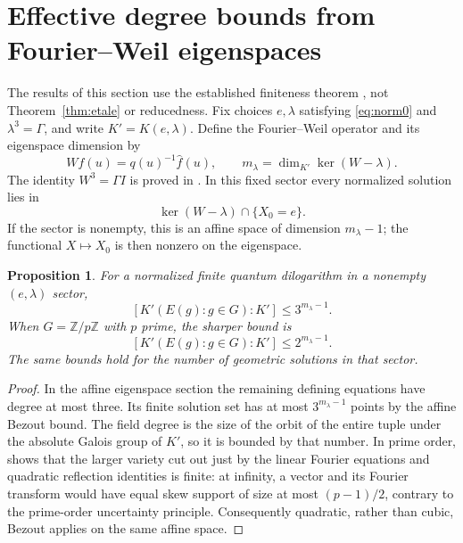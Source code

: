 \documentclass[11pt]{article}
\newtheorem{proposition}[theorem]{Proposition}
\theoremstyle{remark}
\newcommand{\Z}{\mathbb Z}
\begin{document}
\section{Effective degree bounds from Fourier--Weil eigenspaces}
The results of this section use the established finiteness theorem
\cite[Section~5]{RW2}, not Theorem~\ref{thm:etale} or reducedness.
Fix choices $e,\lambda$ satisfying \eqref{eq:norm0} and
$\lambda^3=\Gamma$, and write $K'=K(e,\lambda)$.
Define the Fourier--Weil operator and its eigenspace dimension by
\[
 Wf(u)=q(u)^{-1}\widehat f(u),\qquad
 m_\lambda=\dim_{K'}\ker(W-\lambda).
\]
The identity $W^3=\Gamma I$ is proved in
\cite[proof of Theorem 5]{RW}. In this fixed sector every normalized solution
lies in
\[
 \ker(W-\lambda)\cap\{X_0=e\}.
\]
If the sector is nonempty, this is an affine space of dimension
$m_\lambda-1$; the functional $X\mapsto X_0$ is then nonzero on the eigenspace.

\begin{proposition}\label{prop:degree}
For a normalized finite quantum dilogarithm in a nonempty $(e,\lambda)$ sector,
\[
 [K'(E(g):g\in G):K']\le 3^{m_\lambda-1}.
\]
When $G=\Z/p\Z$ with $p$ prime, the sharper bound is
\[
 [K'(E(g):g\in G):K']\le 2^{m_\lambda-1}.
\]
The same bounds hold for the number of geometric solutions in that sector.
\end{proposition}
\begin{proof}
In the affine eigenspace section the remaining defining equations have degree
at most three. Its finite solution set has at most $3^{m_\lambda-1}$ points
by the affine Bezout bound. The field degree is the size of the orbit of the
entire tuple under the absolute Galois group of $K'$, so it is bounded by that
number. In prime order, \cite[Section~5.1, prime-order uncertainty argument]{RW2} shows that the larger variety
cut out just by the linear Fourier equations and quadratic reflection
identities is finite: at infinity, a vector and its Fourier transform would
have equal skew support of size at most $(p-1)/2$, contrary to the prime-order
uncertainty principle. Consequently quadratic, rather than cubic, Bezout
applies on the same affine space.
\end{proof}
\end{document}
